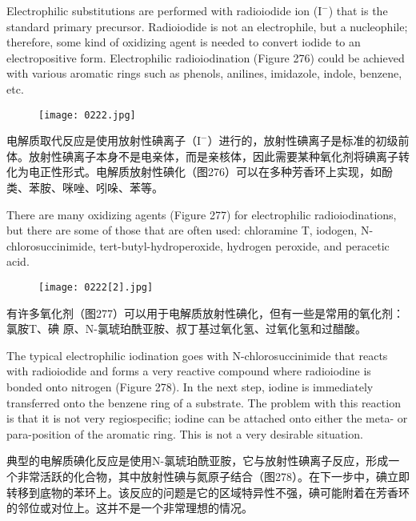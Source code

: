 \documentclass[dvipsnames, svgnames,a4paper,11pt]{article}
\begin{document}
Electrophilic substitutions are performed with radioiodide ion (\(\mathrm{I^{-}}\)) that is the standard primary precursor. Radioiodide is not an electrophile, but a nucleophile; therefore, some kind of oxidizing agent is needed to convert iodide to an electropositive form. Electrophilic radioiodination (Figure 276) could be achieved with various aromatic rings such as phenols, anilines, imidazole, indole, benzene, etc.

\begin{figure}[h]
	\centering
    \texttt{[image: 0222.jpg]}  
     \label{fig276}
\end{figure}


电解质取代反应是使用放射性碘离子（\(\mathrm{I^{-}}\)）进行的，放射性碘离子是标准的初级前体。放射性碘离子本身不是电亲体，而是亲核体，因此需要某种氧化剂将碘离子转化为电正性形式。电解质放射性碘化（图276）可以在多种芳香环上实现，如酚类、苯胺、咪唑、吲哚、苯等。



There are many oxidizing agents (Figure 277) for electrophilic radioiodinations, but there are some of those that are often used: chloramine T, iodogen, N-chlorosuccinimide, tert-butyl-hydroperoxide, hydrogen peroxide, and peracetic acid.

\begin{figure}[h]
	\centering
    \texttt{[image: 0222[2].jpg]}  
     \label{fig277}
\end{figure}

有许多氧化剂（图277）可以用于电解质放射性碘化，但有一些是常用的氧化剂：氯胺T、碘
原、N-氯琥珀酰亚胺、叔丁基过氧化氢、过氧化氢和过醋酸。


The typical electrophilic iodination goes with N-chlorosuccinimide that reacts with radioiodide and forms a very reactive compound where radioiodine is bonded onto nitrogen (Figure 278). In the next step, iodine is immediately transferred onto the benzene ring of a substrate. The problem with this reaction is that it is not very regiospecific; iodine can be attached onto either the meta- or para-position of the aromatic ring. This is not a very desirable situation.

典型的电解质碘化反应是使用N-氯琥珀酰亚胺，它与放射性碘离子反应，形成一个非常活跃的化合物，其中放射性碘与氮原子结合（图278）。在下一步中，碘立即转移到底物的苯环上。该反应的问题是它的区域特异性不强，碘可能附着在芳香环的邻位或对位上。这并不是一个非常理想的情况。
\end{document}
